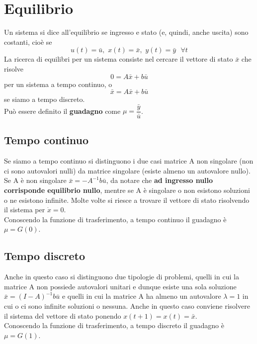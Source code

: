 \documentclass[a4paper]{article}
\begin{document}
	\section{Equilibrio}
	Un sistema si dice all'equilibrio se ingresso e stato (e, quindi, anche uscita) sono costanti, cioè se \[u(t)=\bar{u},\,\,x(t)=\bar{x},\,\,y(t)=\bar{y}\,\,\,\,\forall t\]
	La ricerca di equilibri per un sistema consiste nel cercare il vettore di stato $\bar{x}$ che risolve \[0=A\bar{x}+b\bar{u}\] per un sistema a tempo continuo, o \[\bar{x}=A\bar{x}+b\bar{u}\] se siamo a tempo discreto.
	\\Può essere definito il \textbf{guadagno} come $\mu=\dfrac{\bar{y}}{\bar{u}}$.
	
	\subsection{Tempo continuo}
	Se siamo a tempo continuo si distinguono i due casi matrice A non singolare (non ci sono autovalori nulli) da matrice singolare (esiste almeno un autovalore nullo).
	\\ Se A è non singolare $\bar{x}=-A^{-1}b\bar{u}$, da notare che \textbf{ad ingresso nullo corrisponde equilibrio nullo}, mentre se A è singolare o non esistono soluzioni o ne esistono infinite. Molte volte si riesce a trovare il vettore di stato risolvendo il sistema per $\dot{x}=0$.\\Conoscendo la funzione di trasferimento, a tempo continuo il guadagno è $\mu=G(0)$.
	
	\subsection{Tempo discreto}
	Anche in questo caso si distinguono due tipologie di problemi, quelli in cui la matrice A non possiede autovalori unitari e dunque esiste una sola soluzione $\bar{x}=(I-A)^{-1}b\bar{u}$ e quelli in cui la matrice A ha almeno un autovalore $\lambda=1$ in cui o ci sono infinite soluzioni o nessuna. Anche in questo caso conviene risolvere il sistema del vettore di stato ponendo $x(t+1)=x(t)=\bar{x}$.\\Conoscendo la funzione di trasferimento, a tempo discreto il guadagno è $\mu=G(1)$.
	
\end{document}
